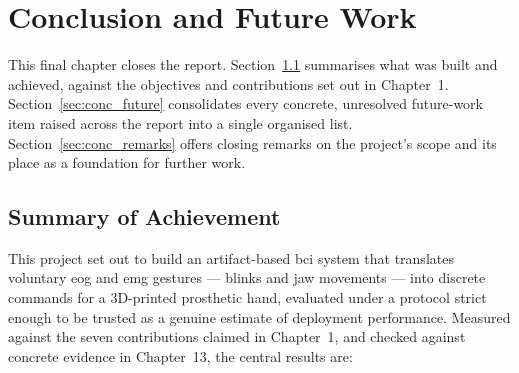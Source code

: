 \chapter{Conclusion and Future Work}
\label{ch:conclusion}

This final chapter closes the report. Section~\ref{sec:conc_summary}
summarises what was built and achieved, against the objectives and
contributions set out in Chapter~1. Section~\ref{sec:conc_future}
consolidates every concrete, unresolved future-work item raised
across the report into a single organised list.
Section~\ref{sec:conc_remarks} offers closing remarks on the
project's scope and its place as a foundation for further work.

\section{Summary of Achievement}
\label{sec:conc_summary}

This project set out to build an artifact-based \acrshort{bci}
system that translates voluntary \acrshort{eog} and \acrshort{emg}
gestures --- blinks and jaw movements --- into discrete commands for
a 3D-printed prosthetic hand, evaluated under a protocol strict
enough to be trusted as a genuine estimate of deployment
performance. Measured against the seven contributions claimed in
Chapter~1, and checked against concrete evidence in Chapter~13, the
central results are:

